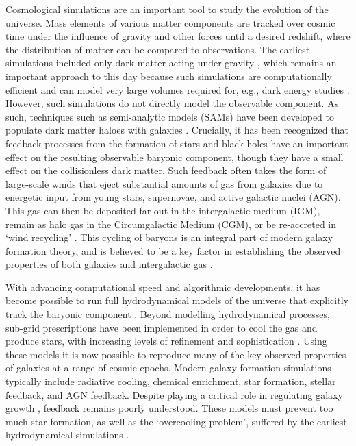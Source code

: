 \documentclass[fleqn,usenatbib]{mnras}
\begin{document}
Cosmological simulations are an important tool to study the evolution of the
universe. Mass elements of various matter components are tracked over cosmic
time under the influence of gravity and other forces until a desired
redshift, where the distribution of matter can be compared to observations.
The earliest simulations included only dark matter acting under gravity
\citep[see e.g.][]{Frenk1988, Springel2005a}, which remains an important
approach to this day because such simulations are computationally efficient
and can model very large volumes required for, e.g., dark energy studies
\citep{Knabenhans2019}. However, such simulations do not directly model the
observable component. As such, techniques such as semi-analytic models (SAMs)
have been developed \citep{FrenkWhite1990,Kauffmann1996,Somerville1998} to
populate dark matter haloes with galaxies \citep[see e.g.][for modern examples
of SAM frameworks]{Porter2014, Henriques2015, Somerville2015b, Lacey2016, Croton2016}.
Crucially, it has been recognized that feedback processes from the formation
of stars and black holes have an important effect on the resulting observable
baryonic component, though they have a small effect on the collisionless dark
matter. Such feedback often takes the form of large-scale winds that eject
substantial amounts of gas from galaxies due to energetic input from young
stars, supernovae, and active galactic nuclei (AGN). This gas can then be
deposited far out in the intergalactic medium (IGM), remain as halo gas in
the Circumgalactic Medium (CGM), or be re-accreted in `wind recycling'
\citep{Oppenheimer2010, Christensen2016, AnglesAlcazar2017, Hafen2019,
Christensen2018}. This cycling of baryons is an integral part of modern
galaxy formation theory, and is believed to be a key factor in establishing
the observed properties of both galaxies and intergalactic gas
\citep{Somerville2015}.

With advancing computational speed and algorithmic developments, it has
become possible to run full hydrodynamical models of the universe that
explicitly track the baryonic component \citep[e.g.][]{Hernquist1989,
Teyssier2002, Springel2005b}. Beyond modelling hydrodynamical processes,
sub-grid prescriptions have been implemented in order to cool the gas and
produce stars, \pagebreak with increasing levels of refinement and sophistication
\citep[e.g.][]{Revaz2012, Vogelsberger2014, Schaye2015, Hopkins2018}. Using
these models it is now possible to reproduce many of the key observed
properties of galaxies at a range of cosmic epochs. Modern galaxy formation
simulations typically include radiative cooling, chemical enrichment, star
formation, stellar feedback, and AGN feedback. Despite playing a critical
role in regulating galaxy growth \citep{Naab2017}, feedback remains poorly
understood. These models must prevent too much star formation, as well as the
`overcooling problem', suffered by the earliest hydrodynamical simulations
\citep{Dave2001,Balogh2001}.
\end{document}
